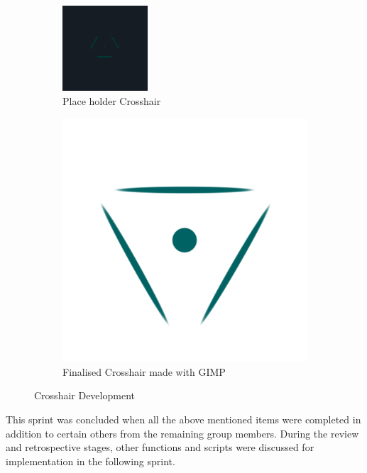\begin{figure}[H]
\centering
\begin{subfigure}{0.5\textwidth}
  \centering
  \includegraphics[scale=1.4]{Figures/crossold.png}
  \caption{Place holder Crosshair}
\end{subfigure}%
\begin{subfigure}{0.5\textwidth}
  \centering
  \includegraphics[scale=1]{Figures/crosshair.png}
  \caption{Finalised Crosshair made with GIMP}
\end{subfigure}
\caption{Crosshair Development}
\label{cross}
\end{figure}

\noindent This sprint was concluded when all the above mentioned items were completed in addition to certain others from the remaining group members. During the review and retrospective stages, other functions and scripts were discussed for implementation in the following sprint.


